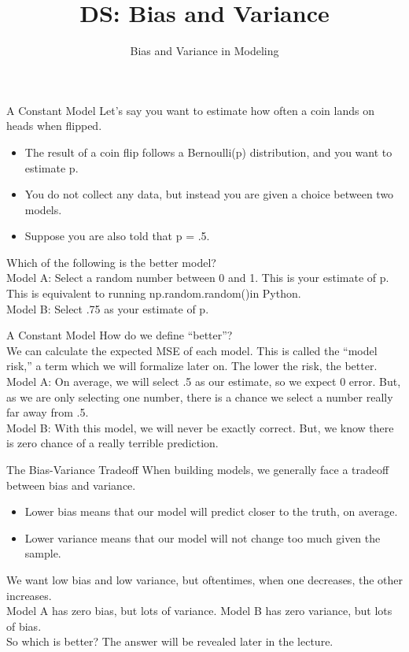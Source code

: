 \documentclass[aspectratio=169]{../latex_main/tntbeamer}  %
\title[Introduction]{DS: Bias and Variance}
\subtitle{Bias and Variance in Modeling}
\begin{document}
	
	\maketitle
	\begin{frame}{A Constant Model}
	    Let’s say you want to estimate how often a coin lands on heads when flipped.
	    \begin{itemize}
	        \item The result of a coin flip follows a Bernoulli(p) distribution, and you want to estimate p.
	        \item You do not collect any data, but instead you are given a choice between two models.
	        \item Suppose you are also told that p = .5.
	    \end{itemize}
	    Which of the following is the better model?\\
	    \bigskip
	    Model A: Select a random number between 0 and 1. This is your estimate of p. This is equivalent to running np.random.random()in Python.\\
	    \bigskip
	    Model B: Select .75 as your estimate of p.
	\end{frame}
	
	
	\begin{frame}{A Constant Model}
	   How do we define “better”?\\
	   \bigskip
	    We can calculate the expected MSE of each model. This is called the “model risk,” a term which we will formalize later on. The lower the risk, the better.\\
	    \bigskip
	    Model A: On average, we will select .5 as our estimate, so we expect 0 error. But, as we are only selecting one number, there is a chance we select a number really far away from .5.\\
	    \bigskip
	    Model B: With this model, we will never be exactly correct. But, we know there is zero chance of a really terrible prediction.
	\end{frame}
	
	
	\begin{frame}[c]{The Bias-Variance Tradeoff}
	   When building models, we generally face a tradeoff between bias and variance.
	   \begin{itemize}
	       \item Lower bias means that our model will predict closer to the truth, on average.
	       \item Lower variance means that our model will not change too much given the sample.
	   \end{itemize}
	   \bigskip
	   We want low bias and low variance, but oftentimes, when one decreases, the other increases.\\
	   Model A has zero bias, but lots of variance. Model B has zero variance, but lots of bias.\\
	   \bigskip
	   So which is better? The answer will be revealed later in the lecture.
	\end{frame}
	
\end{document}
